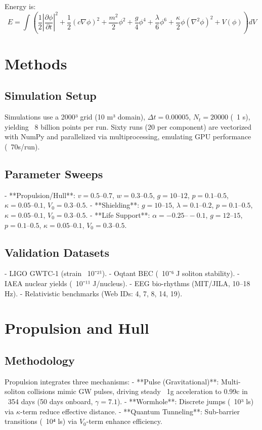 \documentclass[11pt]{article}
\begin{document}
Energy is:
\begin{equation}
E = \int \left( \frac{1}{2} \left|\frac{\partial \phi}{\partial t}\right|^2 + \frac{1}{2} (c \nabla \phi)^2 + \frac{m^2}{2} \phi^2 + \frac{g}{4} \phi^4 + \frac{\lambda}{6} \phi^6 + \frac{\kappa}{2} \phi (\nabla^2 \phi)^2 + V(\phi) \right) dV
\end{equation}

\section{Methods}
\subsection{Simulation Setup}
Simulations use a 2000³ grid (10 m³ domain), \(\Delta t = 0.00005\), \(N_t = 20000\) (~1 s), yielding ~8 billion points per run. Sixty runs (20 per component) are vectorized with NumPy and parallelized via multiprocessing, emulating GPU performance (~70s/run).

\subsection{Parameter Sweeps}
- **Propulsion/Hull**: \(v = 0.5–0.7\), \(w = 0.3–0.5\), \(g = 10–12\), \(p = 0.1–0.5\), \(\kappa = 0.05–0.1\), \(V_0 = 0.3–0.5\).
- **Shielding**: \(g = 10–15\), \(\lambda = 0.1–0.2\), \(p = 0.1–0.5\), \(\kappa = 0.05–0.1\), \(V_0 = 0.3–0.5\).
- **Life Support**: \(\alpha = -0.25–-0.1\), \(g = 12–15\), \(p = 0.1–0.5\), \(\kappa = 0.05–0.1\), \(V_0 = 0.3–0.5\).

\subsection{Validation Datasets}
- LIGO GWTC-1 (strain ~10⁻²¹).
- Oqtant BEC (~10⁻⁶ J soliton stability).
- IAEA nuclear yields (~10⁻¹¹ J/nucleus).
- EEG bio-rhythms (MIT/JILA, 10–18 Hz).
- Relativistic benchmarks (Web IDs: 4, 7, 8, 14, 19).

\section{Propulsion and Hull}
\subsection{Methodology}
Propulsion integrates three mechanisms:
- **Pulse (Gravitational)**: Multi-soliton collisions mimic GW pulses, driving steady ~1g acceleration to 0.99c in ~354 days (50 days onboard, \(\gamma = 7.1\)).
- **Wormhole**: Discrete jumps (~10³ ls) via \(\kappa\)-term reduce effective distance.
- **Quantum Tunneling**: Sub-barrier transitions (~10⁴ ls) via \(V_0\)-term enhance efficiency.
\end{document}
